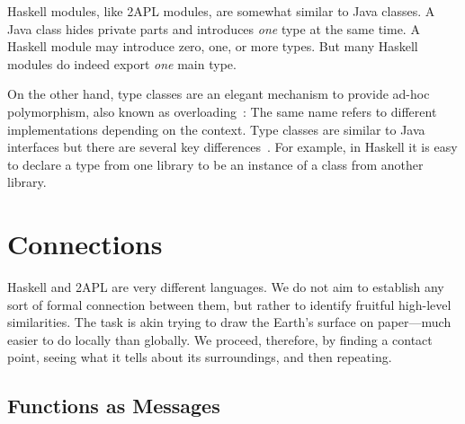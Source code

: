 \documentclass[conference,compsoc]{IEEEtran} %
\begin{document}
Haskell modules, like 2APL modules,  are somewhat similar to Java classes.
A Java class hides private parts and introduces \emph{one} type at the same
time. A Haskell module may introduce zero, one, or more types.  But many
Haskell modules do indeed export \emph{one} main type. 

On the other hand, type classes are an elegant mechanism to provide ad-hoc
polymorphism, also known as overloading~\cite{DBLP:conf/popl/WadlerB89}:
The same name refers to different implementations depending on the context.
Type classes are similar to Java interfaces but there are several key
differences~\cite{WEB:PJ-tc}. For example, in Haskell it is easy to declare
a type from one library to be an instance of a class from another library.

\section{Connections} %

Haskell and 2APL are very different languages. We do not aim to establish
any sort of formal connection between them, but rather to identify fruitful
high-level similarities. The task is akin trying to draw the Earth's
surface on paper---much easier to do locally than globally. We proceed,
therefore, by finding a contact point, seeing what it tells about its
surroundings, and then repeating.

\subsection{Functions as Messages} %
\end{document}
